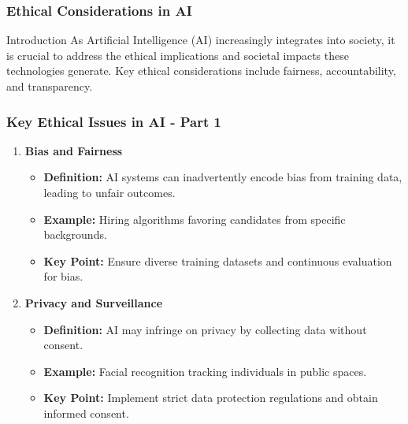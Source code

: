 \documentclass[aspectratio=169]{beamer}
\begin{document}
\begin{frame}[fragile]
    \frametitle{Ethical Considerations in AI}
    \begin{block}{Introduction}
        As Artificial Intelligence (AI) increasingly integrates into society, it is crucial to address the ethical implications and societal impacts these technologies generate. Key ethical considerations include fairness, accountability, and transparency.
    \end{block}
\end{frame}

\begin{frame}[fragile]
    \frametitle{Key Ethical Issues in AI - Part 1}
    \begin{enumerate}
        \item \textbf{Bias and Fairness}
        \begin{itemize}
            \item \textbf{Definition:} AI systems can inadvertently encode bias from training data, leading to unfair outcomes.
            \item \textbf{Example:} Hiring algorithms favoring candidates from specific backgrounds.
            \item \textbf{Key Point:} Ensure diverse training datasets and continuous evaluation for bias.
        \end{itemize}
        
        \item \textbf{Privacy and Surveillance}
        \begin{itemize}
            \item \textbf{Definition:} AI may infringe on privacy by collecting data without consent.
            \item \textbf{Example:} Facial recognition tracking individuals in public spaces.
            \item \textbf{Key Point:} Implement strict data protection regulations and obtain informed consent.
        \end{itemize}
    \end{enumerate}
\end{frame}
\end{document}
